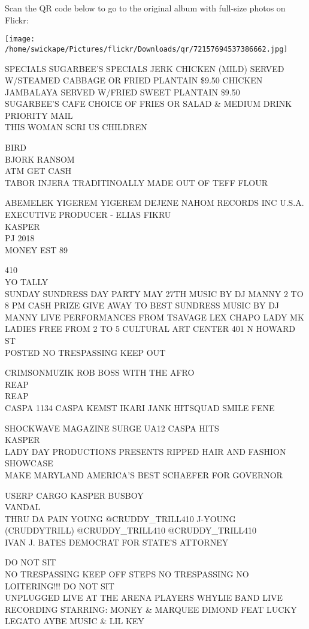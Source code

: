 \documentclass[10pt,letterpaper]{article}
\begin{document}
Scan the QR code below to go to the original album with full-size photos on Flickr:

\texttt{[image: /home/swickape/Pictures/flickr/Downloads/qr/72157694537386662.jpg]}


SPECIALS SUGARBEE'S SPECIALS JERK CHICKEN (MILD) SERVED W/STEAMED CABBAGE OR FRIED PLANTAIN \$9.50 CHICKEN JAMBALAYA SERVED W/FRIED SWEET PLANTAIN \$9.50\\
SUGARBEE'S CAFE CHOICE OF FRIES OR SALAD \& MEDIUM DRINK\\
PRIORITY MAIL\\
THIS WOMAN SCRI US CHILDREN

BIRD\\
BJORK RANSOM\\
ATM GET CASH\\
TABOR INJERA TRADITINOALLY MADE OUT OF TEFF FLOUR

ABEMELEK YIGEREM YIGEREM DEJENE NAHOM RECORDS INC U.S.A. EXECUTIVE PRODUCER {-} ELIAS FIKRU\\
KASPER\\
PJ 2018\\
MONEY EST 89

410\\
YO TALLY\\
SUNDAY SUNDRESS DAY PARTY MAY 27TH MUSIC BY DJ MANNY 2 TO 8 PM CASH PRIZE GIVE AWAY TO BEST SUNDRESS MUSIC BY DJ MANNY LIVE PERFORMANCES FROM TSAVAGE LEX CHAPO LADY MK LADIES FREE FROM 2 TO 5 CULTURAL ART CENTER 401 N HOWARD ST\\
POSTED NO TRESPASSING KEEP OUT

CRIMSONMUZIK ROB BOSS WITH THE AFRO\\
REAP\\
REAP\\
CASPA 1134 CASPA KEMST IKARI JANK HITSQUAD SMILE FENE

SHOCKWAVE MAGAZINE SURGE UA12 CASPA HITS\\
KASPER\\
LADY DAY PRODUCTIONS PRESENTS RIPPED HAIR AND FASHION SHOWCASE\\
MAKE MARYLAND AMERICA'S BEST SCHAEFER FOR GOVERNOR

USERP CARGO KASPER BUSBOY\\
VANDAL\\
THRU DA PAIN YOUNG @CRUDDY\_TRILL410 J{-}YOUNG (CRUDDYTRILL) @CRUDDY\_TRILL410 @CRUDDY\_TRILL410\\
IVAN J. BATES DEMOCRAT FOR STATE'S ATTORNEY

DO NOT SIT\\
NO TRESPASSING KEEP OFF STEPS NO TRESPASSING NO LOITERING!!! DO NOT SIT\\
UNPLUGGED LIVE AT THE ARENA PLAYERS WHYLIE BAND LIVE RECORDING STARRING: MONEY \& MARQUEE DIMOND FEAT LUCKY LEGATO AYBE MUSIC \& LIL KEY
\end{document}
